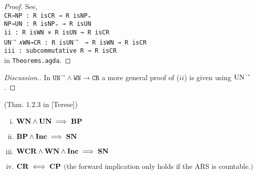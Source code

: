 \begin{proof}
    See, \\
    \verb|CR→NP : R isCR → R isNP₌|\\
    \verb|NP→UN : R isNP₌ → R isUN|\\
    \verb|ii : R isWN × R isUN → R isCR|\\
    \verb||\texttt{UN}$^{\to}$ \verb|∧WN→CR : R |\texttt{isUN}$^{\to}$ \verb| → R isWN → R isCR|\\
    \verb|iii : subcommutative R → R isCR|\\
    in \texttt{Theorems.agda}.
\end{proof}
\begin{proof}[Discussion.]
    In $\mathtt{UN^{→}∧WN→CR}$ a more general proof of ($ii$) is given using $\mathrm{UN}^{\to}$.
\end{proof}

\begin{theorem}(Thm. 1.2.3 in [Terese])
  \begin{enumerate}[(i)]
    \item $\mathbf{WN} \land \mathbf{UN} \implies \mathbf{BP}$
    \item $\mathbf{BP} \land \mathbf{Inc} \implies \mathbf{SN}$
    \item $\mathbf{WCR} \land \mathbf{WN} \land \mathbf{Inc} \implies \mathbf{SN}$
    \item $\mathbf{CR} \iff \mathbf{CP}$ $($the forward implication only holds if the ARS is countable.$)$
  \end{enumerate}
\end{theorem}

